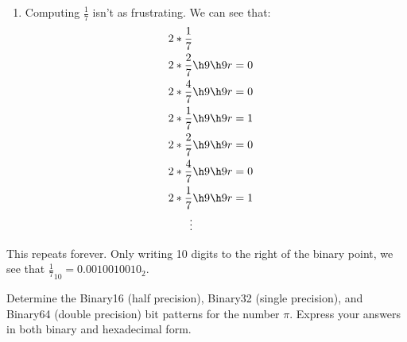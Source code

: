 \documentclass[11pt,twoside,openany]{memoir}
\begin{document}
\begin{solution}
\begin{enumerate}[label = (\arabic*),itemsep=1pt,topsep=3pt]
                \item Computing $\frac{1}{7}$ isn't as frustrating. We can see that:
                    \begin{equation*}
                    \begin{split}
                        2 \ast \frac{1}{7} \\
                        2 \ast \frac{2}{7} &\h9\h9 r=0 \\
                        2 \ast \frac{4}{7} &\h9\h9 r=0 \\
                        2 \ast \frac{1}{7} &\h9\h9 r=1 \\
                        2 \ast \frac{2}{7} &\h9\h9 r=0 \\
                        2 \ast \frac{4}{7} &\h9\h9 r=0 \\
                        2 \ast \frac{1}{7} &\h9\h9 r=1 \\
                        \vdots
                    \end{split}
                    \end{equation*}
                    \end{enumerate}
                This repeats forever. Only writing 10 digits to the right of the binary point, we see that $\frac{1}{7}_{10} = 0.0010010010_2$.
        \end{solution}
    \begin{problem}
        Determine the Binary16 (half precision), Binary32 (single precision), and Binary64 (double precision) bit patterns for the number $\pi$. Express your answers in both binary and hexadecimal form.
    \end{problem}
\end{document}
